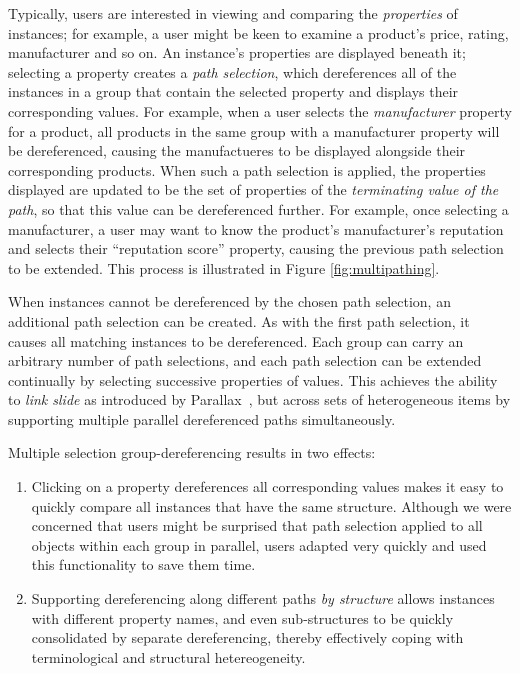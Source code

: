 \documentclass{sigchi}
\begin{document}
Typically, users are interested in viewing and comparing the \emph{properties} of instances; for example, a user might be keen to examine a product's price, rating, manufacturer and so on.  An instance's properties are displayed beneath it; selecting a property creates a \emph{path selection}, which dereferences all of the instances in a group that contain the selected property and displays their corresponding values.  For example, when a user selects the \emph{manufacturer} property for a product, all products in the same group with a manufacturer property will be dereferenced, causing the manufactueres to be displayed alongside their corresponding products.  When such a path selection is applied, the properties displayed are updated to be the set of properties of the \emph{terminating value of the path}, so that this value can be dereferenced further.  For example, once selecting a manufacturer, a user may want to know the product's manufacturer's reputation and selects their ``reputation score'' property, causing the previous path selection to be extended. This process is illustrated in Figure \ref{fig:multipathing}.

When instances cannot be dereferenced by the chosen path selection, an additional path selection can be created. As with the first path selection, it causes all matching instances to be dereferenced.  Each group can carry an arbitrary number of path selections, and each path selection can be extended continually by selecting successive properties of values. This achieves the ability to \emph{link slide} as introduced by Parallax~\cite{parallax}, but across sets of heterogeneous items by supporting multiple parallel dereferenced paths simultaneously.  

Multiple selection group-dereferencing results in two effects: 

\begin{enumerate}
\item Clicking on a property dereferences all corresponding values makes it easy to quickly compare all instances that have the same structure.  Although we were concerned that users might be surprised that path selection applied to all objects within each group in parallel, users adapted very quickly and used this functionality to save them time.   

\item Supporting dereferencing along different paths \emph{by structure} allows instances with different property names, and even sub-structures to be quickly consolidated by separate dereferencing, thereby effectively coping with terminological and structural hetereogeneity.
\end{enumerate}
\end{document}
